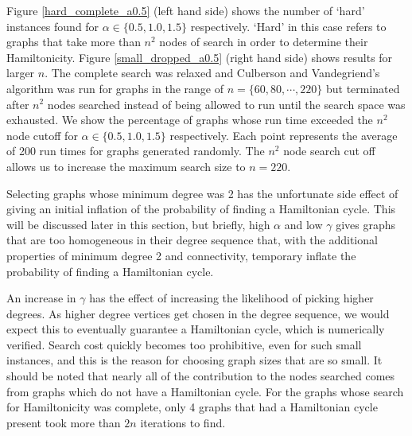 \documentclass[twoside,11pt]{article}
\begin{document}
Figure \ref{hard_complete_a0.5} (left hand side) shows the number of `hard' instances found
for $\alpha \in \{ 0.5, 1.0, 1.5 \}$ respectively.
`Hard' in this case refers to graphs that take more than $n^2$ nodes of search in order to determine their Hamiltonicity.
Figure \ref{small_dropped_a0.5} (right hand side) shows results for larger $n$.  
The complete search was relaxed 
and Culberson and Vandegriend's algorithm 
was run
for graphs in the range of $n = \{ 60, 80, \cdots, 220 \} $
but terminated after $n^2$ nodes searched instead of being allowed to run until the search space was exhausted.
We show the percentage of graphs whose run time exceeded the $n^2$ node cutoff for $\alpha \in \{ 0.5, 1.0, 1.5 \}$
respectively.
Each point represents the average
of 200 run times for graphs generated randomly.
The $n^2$ node search cut off allows us to increase the maximum search size to $n = 220$.

Selecting graphs whose minimum degree was 2 has the unfortunate side effect of giving an initial inflation
of the probability of finding a Hamiltonian cycle.  This will be discussed later in this section, but briefly,
high $\alpha$ and low $\gamma$ gives graphs that are too homogeneous in their degree sequence that, with the additional
properties of minimum degree 2 and connectivity, temporary inflate the probability of finding a Hamiltonian
cycle.


An increase in $\gamma$ has the effect of increasing the likelihood of picking higher degrees.  As higher degree vertices
get chosen in the degree sequence, we would expect this to eventually guarantee a Hamiltonian cycle, which is numerically
verified.
Search cost quickly becomes too prohibitive, even for such small instances, and this is the reason for choosing graph sizes that
are so small.
It should
be noted that nearly all of the
contribution to the nodes searched comes from graphs which do not have a Hamiltonian cycle.
For the graphs whose search for Hamiltonicity was complete,
only 4 graphs that had a Hamiltonian cycle present
took more than $2 n$ iterations to find.
\end{document}
